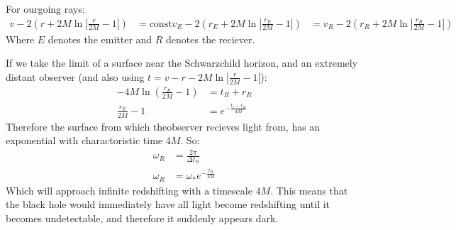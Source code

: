 For ourgoing rays:
\begin{align*}
	v- 2\left(r + 2M \ln |\frac{r}{2M} -1 |\right) &= \text{const}
	v_E- 2\left(r_E + 2M \ln |\frac{r_E}{2M} -1 |\right) &= v_R- 2\left(r_R + 2M \ln |\frac{r_R}{2M} -1 |\right)
\end{align*}
Where $E$ denotes the emitter and $R$ denotes the reciever.

If we take the limit of a surface near the Schwarzchild horizon, and an extremely distant observer (and also using $t=v-r-2M\ln|\frac{r}{2M} - 1|$):
\begin{align*}
	- 4M \ln \left(\frac{r_E}{2M} -1 \right) &= t_R + r_R \\
	\frac{r_E}{2M}  -1 &= e^{-\frac{t_r - r_R}{4M}}
\end{align*}
Therefore the surface from which theobserver recieves light from, has an exponential with charactoristic time $4M$. So:
\begin{align*}
	\omega_R &= \frac{2\pi}{\Delta t_R} \\
	\omega_R &= \omega_* e^{-\frac{t_R}{4M}}
\end{align*}
Which will approach infinite redshifting with a timescale $4M$. This means that the black hole would immediately have all light become redshifting until it becomes undetectable, and therefore it suddenly appears dark.
